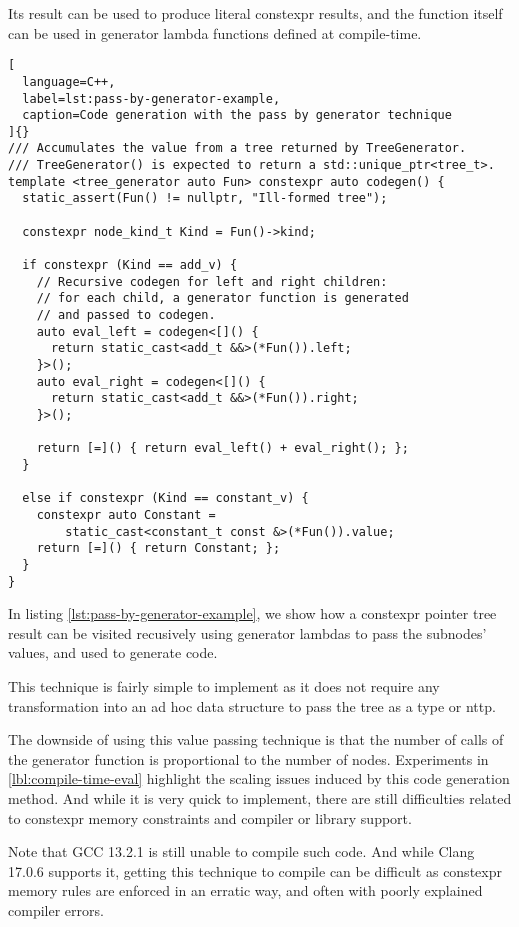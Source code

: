 \documentclass[../main]{subfiles}
\begin{document}
Its result can be used to produce literal \gls{constexpr} results,
and the function itself can be used in generator lambda functions
defined at compile-time.

\begin{lstlisting}[
  language=C++,
  label=lst:pass-by-generator-example,
  caption=Code generation with the pass by generator technique
]{}
/// Accumulates the value from a tree returned by TreeGenerator.
/// TreeGenerator() is expected to return a std::unique_ptr<tree_t>.
template <tree_generator auto Fun> constexpr auto codegen() {
  static_assert(Fun() != nullptr, "Ill-formed tree");

  constexpr node_kind_t Kind = Fun()->kind;

  if constexpr (Kind == add_v) {
    // Recursive codegen for left and right children:
    // for each child, a generator function is generated
    // and passed to codegen.
    auto eval_left = codegen<[]() {
      return static_cast<add_t &&>(*Fun()).left;
    }>();
    auto eval_right = codegen<[]() {
      return static_cast<add_t &&>(*Fun()).right;
    }>();

    return [=]() { return eval_left() + eval_right(); };
  }

  else if constexpr (Kind == constant_v) {
    constexpr auto Constant =
        static_cast<constant_t const &>(*Fun()).value;
    return [=]() { return Constant; };
  }
}
\end{lstlisting}

In listing \ref{lst:pass-by-generator-example}, we show how a \gls{constexpr}
pointer tree result can be visited recusively using generator lambdas
to pass the subnodes' values, and used to generate code.

This technique is fairly simple to implement as it does not require any
transformation into an ad hoc data structure to pass the tree as a type
or \gls{nttp}.

The downside of using this value passing technique is that the
number of calls of the generator function is proportional to the
number of nodes. Experiments in \ref{lbl:compile-time-eval} highlight
the scaling issues induced by this code generation method.
And while it is very quick to implement, there are still difficulties
related to \gls{constexpr} memory constraints and compiler or library support.

Note that GCC 13.2.1 is still unable to compile such code.
And while Clang 17.0.6 supports it, getting this technique to compile can be
difficult as \gls{constexpr} memory rules are enforced in an erratic way,
and often with poorly explained compiler errors.
\end{document}
